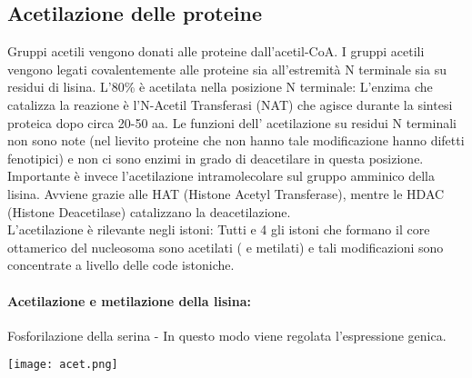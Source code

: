 \documentclass{article}
\begin{document}
\subsection{Acetilazione delle proteine}
Gruppi acetili vengono donati alle proteine dall'acetil-CoA. I gruppi acetili vengono legati covalentemente alle proteine sia all'estremità N terminale
sia su residui di lisina. L'80\% è acetilata nella posizione N terminale:
L'enzima che catalizza la reazione è l'N-Acetil Transferasi (NAT) che agisce
durante la sintesi proteica dopo circa 20-50 aa. Le funzioni dell' acetilazione su residui N terminali non sono note (nel lievito
proteine che non hanno tale modificazione hanno difetti fenotipici) e non ci sono enzimi in grado di deacetilare in questa posizione.\\
Importante è invece l'acetilazione intramolecolare sul gruppo amminico della lisina. Avviene grazie alle HAT (Histone Acetyl Transferase), mentre le HDAC (Histone Deacetilase) catalizzano la deacetilazione.\\
L'acetilazione è rilevante negli istoni: Tutti e 4 gli istoni che formano il core ottamerico del nucleosoma sono acetilati ( e metilati) e tali modificazioni
sono concentrate a livello delle code istoniche.\\
\paragraph{Acetilazione e metilazione della lisina:}
Fosforilazione della serina - In questo modo viene regolata l'espressione genica.
\begin{center}
    \texttt{[image: acet.png]}
\end{center}
\end{document}
